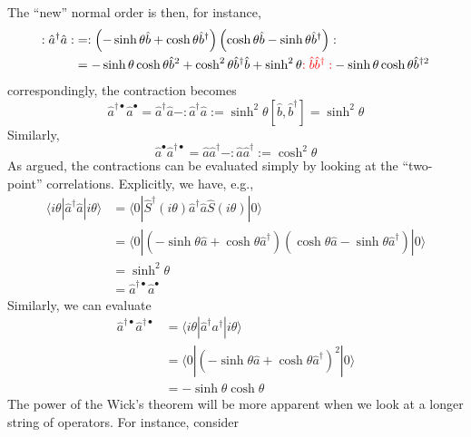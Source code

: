 The ``new'' normal order is then, for instance,
\begin{align*}
    :\hat{a}^{\dagger}\hat{a}:&=:\left( -\sinh \theta \hat{b}+\cosh \theta \hat{b}^{\dagger} \right) \left( \cosh \theta \hat{b}-\sinh \theta \hat{b}^{\dagger} \right) :\\
    &=-\sinh \theta \cosh \theta \hat{b}^2+\cosh ^2\theta \hat{b}^{\dagger}\hat{b}+\sinh ^2\theta {\color{red} :\hat{b}\hat{b}^{\dagger}:}-\sinh \theta \cosh \theta \hat{b}^{\dagger 2}
\end{align*}
correspondingly, the contraction becomes
\[ \hat{a}^{\dagger \bullet}\hat{a}^{\bullet}=\hat{a}^{\dagger}\hat{a}-:\hat{a}^{\dagger}\hat{a}:=\sinh ^2\theta \left[ \hat{b},\hat{b}^{\dagger} \right] =\sinh ^2\theta \]
Similarly,
\[ \hat{a}^{\bullet}\hat{a}^{\dagger \bullet}=\hat{a}\hat{a}^{\dagger}-:\hat{a}\hat{a}^{\dagger}:=\cosh ^2\theta \]
As argued, the contractions can be evaluated simply by looking at the ``two-point'' correlations. Explicitly, we have, e.g.,
\begin{align*}
    \langle i\theta |\hat{a}^{\dagger}\hat{a}|i\theta \rangle &=\langle 0|\hat{S}^{\dagger}\left( i\theta \right) \hat{a}^{\dagger}\hat{a}\hat{S}\left( i\theta \right) |0\rangle \\
    &=\langle 0|\left( -\sinh \theta \hat{a}+\cosh \theta \hat{a}^{\dagger} \right) \left( \cosh \theta \hat{a}-\sinh \theta \hat{a}^{\dagger} \right) |0\rangle \\
    &=\sinh ^2\theta \\
    &=\hat{a}^{\dagger \bullet}\hat{a}^{\bullet}
\end{align*}
Similarly, we can evaluate
\begin{align*}
    \hat{a}^{\dagger \bullet}\hat{a}^{\dagger \bullet}&=\langle i\theta |\hat{a}^{\dagger}a^{\dagger}|i\theta \rangle \\
    &=\langle 0|\left( -\sinh \theta \hat{a}+\cosh \theta \hat{a}^{\dagger} \right) ^2|0\rangle \\
    &=-\sinh \theta \cosh \theta
\end{align*}
The power of the Wick's theorem will be more apparent when we look at a longer string of operators. For instance, consider
